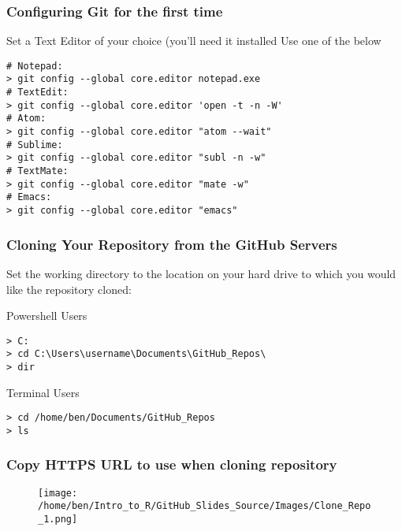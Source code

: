 \documentclass[xcolor=dvipsnames]{beamer}
\begin{document}
\begin{frame}[fragile]
\frametitle{Configuring Git for the first time}

\begin{block}{Set a Text Editor of your choice (you'll need it installed}
Use one of the below
\begin{lstlisting}
# Notepad:
> git config --global core.editor notepad.exe
# TextEdit:
> git config --global core.editor 'open -t -n -W'
# Atom:
> git config --global core.editor "atom --wait"
# Sublime:
> git config --global core.editor "subl -n -w"
# TextMate:
> git config --global core.editor "mate -w"
# Emacs:
> git config --global core.editor "emacs"
\end{lstlisting}
\end{block}

\end{frame}

\begin{frame}[fragile]
\frametitle{Cloning Your Repository from the GitHub Servers}

Set the working directory to the location on your hard drive to which you would like the repository cloned:

\begin{block}{Powershell Users}
\begin{lstlisting}
> C:
> cd C:\Users\username\Documents\GitHub_Repos\
> dir 
\end{lstlisting}
\end{block}

\begin{block}{Terminal Users}
\begin{lstlisting}
> cd /home/ben/Documents/GitHub_Repos
> ls 
\end{lstlisting}
\end{block}
\end{frame}

\begin{frame}
\frametitle{Copy HTTPS URL to use when cloning repository}
\begin{center}
\begin{figure}
\texttt{[image: /home/ben/Intro\_to\_R/GitHub\_Slides\_Source/Images/Clone\_Repo\_1.png]}
\end{figure}
\end{center}
\end{frame}
\end{document}
